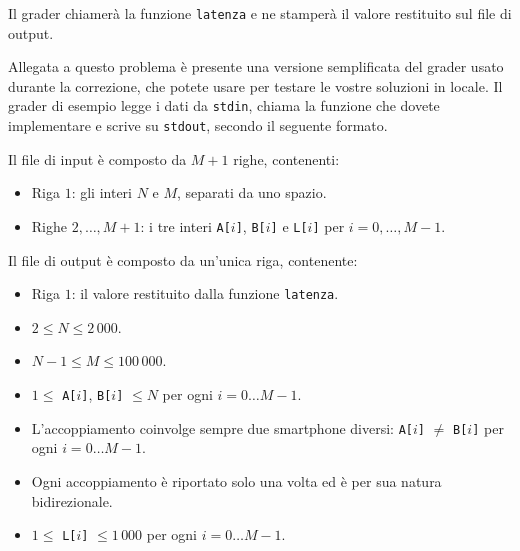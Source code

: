 Il grader chiamerà la funzione \texttt{latenza} e ne stamperà il valore restituito sul file di output.



\Grader
Allegata a questo problema è presente una versione semplificata del grader usato durante la correzione, che potete usare per testare le vostre soluzioni in locale. Il grader di esempio legge i dati da \texttt{stdin}, chiama la funzione che dovete implementare e scrive su \texttt{stdout}, secondo il seguente formato.

Il file di input è composto da $M+1$ righe, contenenti:
\begin{itemize}[nolistsep,itemsep=2mm]
    \item Riga $1$: gli interi $N$ e $M$, separati da uno spazio.
    \item Righe $2,\ldots, M+1$: i tre interi \texttt{A[$i$]}, \texttt{B[$i$]} e \texttt{L[$i$]} per $i = 0,\ldots, M-1$.
\end{itemize}

Il file di output è composto da un'unica riga, contenente:
\begin{itemize}[nolistsep,itemsep=2mm]
    \item Riga $1$: il valore restituito dalla funzione \texttt{latenza}.
\end{itemize}


\Constraints

\begin{itemize}[nolistsep, itemsep=2mm]
\item $2 \le N \le 2\,000$.
\item $N-1 \le M \le 100\,000$.
\item $1 \le $ \texttt{A[$i$]}, \texttt{B[$i$]} $\le N$ per ogni $i=0\ldots M-1$.
\item L'accoppiamento coinvolge sempre due smartphone diversi: \texttt{A[$i$]} $\neq$ \texttt{B[$i$]} per ogni $i=0\ldots M-1$.
\item Ogni accoppiamento è riportato solo una volta ed è per sua natura bidirezionale.
\item $1 \le $ \texttt{L[$i$]} $\le 1\,000$ per ogni $i=0\ldots M-1$.
\end{itemize}

